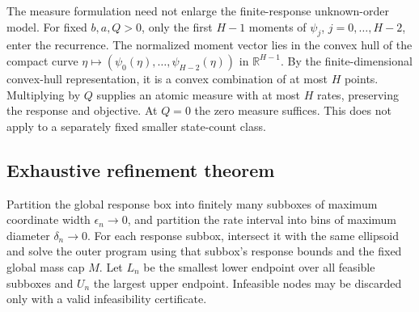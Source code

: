 \documentclass[11pt,a4paper]{article}
\theoremstyle{definition}\newtheorem{definition}[theorem]{Definition}
\theoremstyle{remark}\newtheorem{remark}[theorem]{Remark}
\newcommand{\R}{\mathbb R}\newcommand{\E}{\mathbb E}\newcommand{\Prob}{\mathbb P}
\begin{document}
The measure formulation need not enlarge the finite-response unknown-order model. For fixed $b,a,Q>0$, only the first $H-1$ moments of $\psi_j$, $j=0,\ldots,H-2$, enter the recurrence. The normalized moment vector lies in the convex hull of the compact curve
$\eta\mapsto(\psi_0(\eta),\ldots,\psi_{H-2}(\eta))$ in $\R^{H-1}$. By the finite-dimensional convex-hull representation, it is a convex combination of at most $H$ points. Multiplying by $Q$ supplies an atomic measure with at most $H$ rates, preserving the response and objective. At $Q=0$ the zero measure suffices. This does not apply to a separately fixed smaller state-count class.

\subsection{Exhaustive refinement theorem}
Partition the global response box into finitely many subboxes of maximum coordinate width $\epsilon_n\to0$, and partition the rate interval into bins of maximum diameter $\delta_n\to0$. For each response subbox, intersect it with the same ellipsoid and solve the outer program using that subbox's response bounds and the fixed global mass cap $M$. Let $L_n$ be the smallest lower endpoint over all feasible subboxes and $U_n$ the largest upper endpoint. Infeasible nodes may be discarded only with a valid infeasibility certificate.
\end{document}
